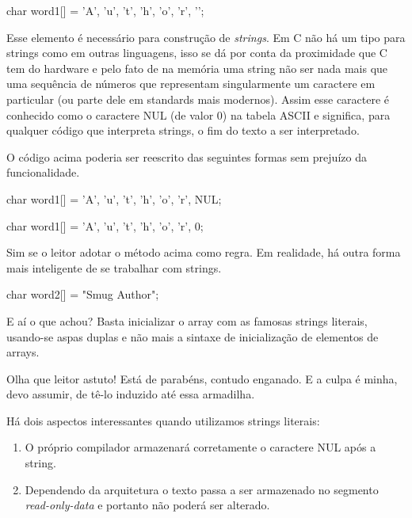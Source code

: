 \begin{ccode}
  char word1[] = {'A', 'u', 't', 'h', 'o', 'r', '\0'};
\end{ccode}


Esse elemento é necessário para construção de \textit{strings}. Em C não há um
tipo para strings como em outras linguagens, isso se dá por conta da
proximidade que C tem do hardware e pelo fato de na memória uma string não ser
nada mais que uma sequência de números que representam singularmente um
caractere em particular (ou parte dele em standards mais modernos). Assim esse
caractere é conhecido como o caractere NUL (de valor 0) na tabela ASCII e
significa, para qualquer código que interpreta strings, o fim do texto a ser
interpretado.

O código acima poderia ser reescrito das seguintes formas sem prejuízo da
funcionalidade.

\begin{ccode}
  char word1[] = {'A', 'u', 't', 'h', 'o', 'r', NUL};
\end{ccode}

\begin{ccode}
  char word1[] = {'A', 'u', 't', 'h', 'o', 'r', 0};
\end{ccode}


Sim se o leitor adotar o método acima como regra. Em realidade, há outra forma
mais inteligente de se trabalhar com strings.

\begin{ccode}
  char word2[] = "Smug Author";
\end{ccode}

E aí o que achou? Basta inicializar o array com as famosas strings literais,
usando-se aspas duplas e não mais a sintaxe de inicialização de elementos de
arrays.


Olha que leitor astuto! Está de parabéns, contudo enganado. E a culpa é minha,
devo assumir, de tê-lo induzido até essa armadilha.

Há dois aspectos interessantes quando utilizamos strings literais:
\begin{enumerate}
\item O próprio compilador armazenará corretamente o caractere NUL após a
  string.
\item Dependendo da arquitetura o texto passa a ser armazenado no segmento
  \textit{read-only-data} e portanto não poderá ser alterado.
\end{enumerate}

